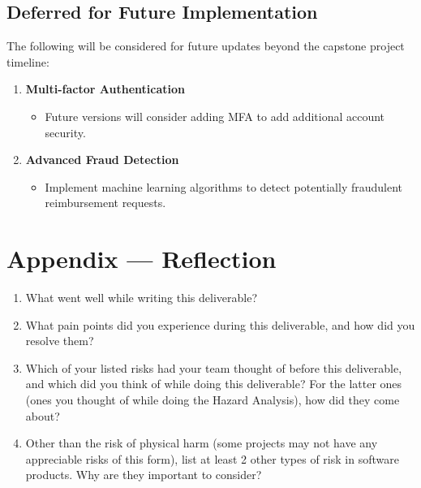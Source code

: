 \documentclass{article}
\begin{document}
\subsection{Deferred for Future Implementation}

The following will be considered for future updates beyond the capstone project timeline:

\begin{enumerate}
    \item \textbf{Multi-factor Authentication}
    \begin{itemize}
        \item Future versions will consider adding MFA to add additional account security.
    \end{itemize}

    \item \textbf{Advanced Fraud Detection}
    \begin{itemize}
        \item Implement machine learning algorithms to detect potentially fraudulent reimbursement requests.
    \end{itemize}
\end{enumerate}

\newpage{}

\section*{Appendix --- Reflection}




\begin{enumerate}
    \item What went well while writing this deliverable? 
    \item What pain points did you experience during this deliverable, and how
    did you resolve them?
    \item Which of your listed risks had your team thought of before this
    deliverable, and which did you think of while doing this deliverable? For
    the latter ones (ones you thought of while doing the Hazard Analysis), how
    did they come about?
    \item Other than the risk of physical harm (some projects may not have any
    appreciable risks of this form), list at least 2 other types of risk in
    software products. Why are they important to consider?
\end{enumerate}
\end{document}
